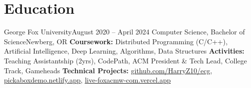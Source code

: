 \section{Education}
  \resumeSubHeadingListStart
    \resumeEducationSubheading
        {George Fox University}{August 2020 -- April 2024}
        {Computer Science, Bachelor of Science}{Newberg, OR}
        {\textbf{Coursework:} Distributed Programming (C/C++), Artificial Intelligence, Deep Learning, Algorithms, Data Structures}
        {\textbf{Activities:} Teaching Assistantship (2yrs), CodePath, ACM President \& Tech Lead, College Track, Gameheads}
        {\textbf{Technical Projects:}
          \underline{\href{https://github.com/HarryZ10/ecg}{{github.com/HarryZ10/ecg}}},
          \underline{\href{https://pickaboxdemo.netlify.app}{{pickaboxdemo.netlify.app}}},
          \underline{\href{https:/live-foxacmw-com.vercel.app}{live-foxacmw-com.vercel.app}}
        }
  \resumeSubHeadingListEnd


